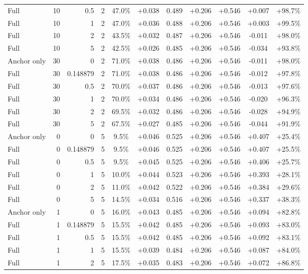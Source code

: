 \begin{table}[htbp]
\begin{tabular}{lrrrccccccc}
Full & 10 & 0.5 & 2 & 47.0\% & +0.038 & 0.489 & +0.206 & +0.546 & +0.007 & +98.7\% \\
Full & 10 & 1 & 2 & 47.0\% & +0.036 & 0.488 & +0.206 & +0.546 & +0.003 & +99.5\% \\
Full & 10 & 2 & 2 & 43.5\% & +0.032 & 0.487 & +0.206 & +0.546 & -0.011 & +98.0\% \\
Full & 10 & 5 & 2 & 42.5\% & +0.026 & 0.485 & +0.206 & +0.546 & -0.034 & +93.8\% \\
Anchor only & 30 & 0 & 2 & 71.0\% & +0.038 & 0.486 & +0.206 & +0.546 & -0.011 & +98.0\% \\
Full & 30 & 0.148879 & 2 & 71.0\% & +0.038 & 0.486 & +0.206 & +0.546 & -0.012 & +97.8\% \\
Full & 30 & 0.5 & 2 & 70.0\% & +0.037 & 0.486 & +0.206 & +0.546 & -0.013 & +97.6\% \\
Full & 30 & 1 & 2 & 70.0\% & +0.034 & 0.486 & +0.206 & +0.546 & -0.020 & +96.3\% \\
Full & 30 & 2 & 2 & 69.5\% & +0.032 & 0.486 & +0.206 & +0.546 & -0.028 & +94.9\% \\
Full & 30 & 5 & 2 & 67.5\% & +0.027 & 0.485 & +0.206 & +0.546 & -0.044 & +91.9\% \\
Anchor only & 0 & 0 & 5 & 9.5\% & +0.046 & 0.525 & +0.206 & +0.546 & +0.407 & +25.4\% \\
Full & 0 & 0.148879 & 5 & 9.5\% & +0.046 & 0.525 & +0.206 & +0.546 & +0.407 & +25.5\% \\
Full & 0 & 0.5 & 5 & 9.5\% & +0.045 & 0.525 & +0.206 & +0.546 & +0.406 & +25.7\% \\
Full & 0 & 1 & 5 & 10.0\% & +0.044 & 0.523 & +0.206 & +0.546 & +0.393 & +28.1\% \\
Full & 0 & 2 & 5 & 11.0\% & +0.042 & 0.522 & +0.206 & +0.546 & +0.384 & +29.6\% \\
Full & 0 & 5 & 5 & 14.5\% & +0.034 & 0.516 & +0.206 & +0.546 & +0.337 & +38.3\% \\
Anchor only & 1 & 0 & 5 & 16.0\% & +0.043 & 0.485 & +0.206 & +0.546 & +0.094 & +82.8\% \\
Full & 1 & 0.148879 & 5 & 15.5\% & +0.042 & 0.485 & +0.206 & +0.546 & +0.093 & +83.0\% \\
Full & 1 & 0.5 & 5 & 15.5\% & +0.042 & 0.485 & +0.206 & +0.546 & +0.092 & +83.1\% \\
Full & 1 & 1 & 5 & 15.5\% & +0.039 & 0.484 & +0.206 & +0.546 & +0.087 & +84.0\% \\
Full & 1 & 2 & 5 & 17.5\% & +0.035 & 0.483 & +0.206 & +0.546 & +0.072 & +86.8\% \\

\end{tabular}
\end{table}
